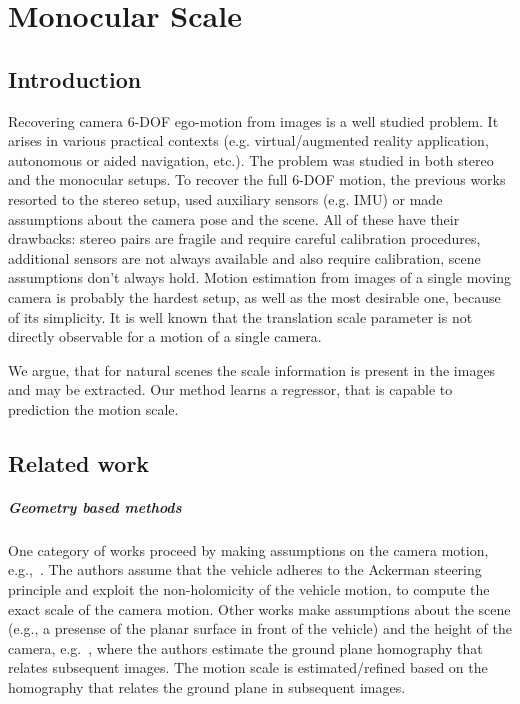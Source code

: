 \chapter{Monocular Scale}

\section{Introduction}

Recovering camera 6-DOF ego-motion from images is a well studied
problem. It arises in various practical contexts
(e.g. virtual/augmented reality application, autonomous or aided
navigation, etc.).  The problem was studied in both stereo and the
monocular setups.  To recover the full 6-DOF motion, the previous
works resorted to the stereo setup, used auxiliary sensors (e.g. IMU)
or made assumptions about the camera pose and the scene.  All of these
have their drawbacks: stereo pairs are fragile and require careful
calibration procedures, additional sensors are not always available
and also require calibration, scene assumptions don't always hold.
Motion estimation from images of a single moving camera is probably
the hardest setup, as well as the most desirable one, because of its
simplicity.  It is well known that the translation scale parameter is
not directly observable for a motion of a single camera.

We argue, that for natural scenes the scale information is present in
the images and may be extracted.  Our method learns a regressor, that
is capable to prediction the motion scale.

\section{Related work}
\paragraph{Geometry based methods} One category of works proceed by
making assumptions on the camera motion,
e.g.,~\cite{scaramuzza2009absolute}.  The authors assume that the
vehicle adheres to the Ackerman steering principle and exploit the
non-holomicity of the vehicle motion, to compute the exact scale of
the camera motion.  Other works make assumptions about the scene
(e.g., a presense of the planar surface in front of the vehicle) and
the height of the camera, e.g.~\cite{zhou2016reliable}, where the
authors estimate the ground plane homography that relates subsequent
images.  The motion scale is estimated/refined based on the homography
that relates the ground plane in subsequent images.
